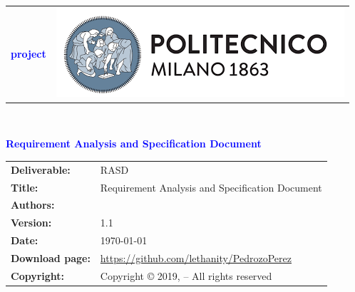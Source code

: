 




\begin{titlepage}



{\begin{table}[t!]
\centering
\begin{tabu} to \textwidth { X[1.3,r,p] X[1.7,l,p] }
\textcolor{Blue}
{\textbf{\small{\projectName{} project \newline \names{}}}} & \includegraphics[scale=0.5]{Images/PolimiLogo}
\end{tabu}
\end{table}}~\\ [7cm]


\begin{flushleft}

{\textcolor{Blue}{\textbf{\Huge{Requirement Analysis and Specification
        Document}}}} \\ [1cm]

\end{flushleft}

\end{titlepage}

\begin{table}[h!]
\begin{tabu} to \textwidth { X[0.3,r,p] X[0.7,l,p] }
\hline

\textbf{Deliverable:} & RASD\\
\textbf{Title:} & Requirement Analysis and Specification Document \\
\textbf{Authors:} & \names{} \\
\textbf{Version:} & 1.1 \\ 
\textbf{Date:} & \today \\
\textbf{Download page:} & \url{https://github.com/lethanity/PedrozoPerez} \\
\textbf{Copyright:} & Copyright © 2019, \names{}  – All rights reserved \\
\hline
\end{tabu}
\end{table}





